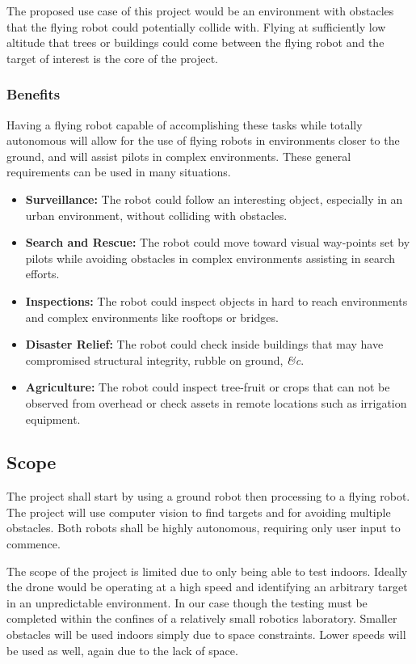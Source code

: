 \documentclass{article}
\begin{document}
		The proposed use case of this project would be an environment with obstacles that the flying robot could potentially collide with. Flying at sufficiently low altitude that trees or buildings could come between the flying robot and the target of interest is the core of the project.
		
		\subsubsection{Benefits}
		
		Having a flying robot capable of accomplishing these tasks while totally autonomous will allow for the use of flying robots in environments closer to the ground, and will assist pilots in complex environments. These general requirements can be used in many situations.
		
		\begin{itemize}
			\item \textbf{Surveillance:} The robot could follow an interesting object, especially in an urban environment, without colliding with obstacles.
			\item \textbf{Search and Rescue:} The robot could move toward visual way-points set by pilots while avoiding obstacles in complex environments assisting in search efforts.
			\item \textbf{Inspections:} The robot could inspect objects in hard to reach environments and complex environments like rooftops or bridges.
			\item \textbf{Disaster Relief:} The robot could check inside buildings that may have compromised structural integrity, rubble on ground, \textit{\&c}.
			\item \textbf{Agriculture:} The robot could inspect tree-fruit or crops that can not be observed from overhead or check assets in remote locations such as irrigation equipment.
		\end{itemize}
		
	\subsection{Scope}
	
	The project shall start by using a ground robot then processing to a flying robot. The project will use computer vision to find targets and for avoiding multiple obstacles. Both robots shall be highly autonomous, requiring only user input to commence. 

	The scope of the project is limited due to only being able to test indoors. Ideally the drone would be operating at a high speed and identifying an arbitrary target in an unpredictable environment. In our case though the testing must be completed within the confines of a relatively small robotics laboratory. Smaller obstacles will be used indoors simply due to space constraints. Lower speeds will be used as well, again due to the lack of space. 
\end{document}
